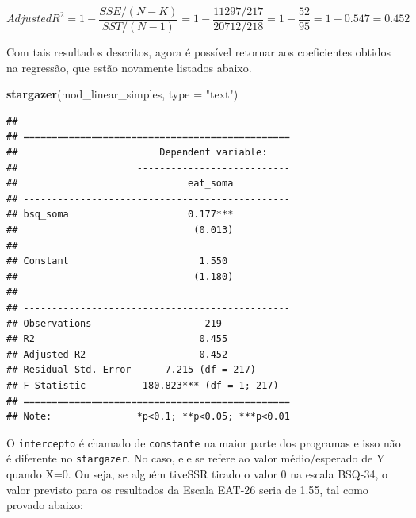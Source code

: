 \documentclass[
]{book}
\newenvironment{Shaded}{\begin{snugshade}}{\end{snugshade}}
\newcommand{\CommentTok}[1]{\textcolor[rgb]{0.56,0.35,0.01}{\textit{#1}}}
\newcommand{\DataTypeTok}[1]{\textcolor[rgb]{0.13,0.29,0.53}{#1}}
\newcommand{\DecValTok}[1]{\textcolor[rgb]{0.00,0.00,0.81}{#1}}
\newcommand{\KeywordTok}[1]{\textcolor[rgb]{0.13,0.29,0.53}{\textbf{#1}}}
\newcommand{\NormalTok}[1]{#1}
\newcommand{\OperatorTok}[1]{\textcolor[rgb]{0.81,0.36,0.00}{\textbf{#1}}}
\newcommand{\StringTok}[1]{\textcolor[rgb]{0.31,0.60,0.02}{#1}}
\begin{document}
\[Adjusted R^2 = 1 - \frac{SSE/(N-K)}{SST/(N-1)} = 1-\frac{11297/217}{20712/218} = 1-\frac{52}{95} = 1 - 0.547 = 0.452\]

\begin{Shaded}
\end{Shaded}

Com tais resultados descritos, agora é possível retornar aos coeficientes obtidos na regressão, que estão novamente listados abaixo.

\begin{Shaded}
\begin{Highlighting}[]
\KeywordTok{stargazer}\NormalTok{(mod_linear_simples, }\DataTypeTok{type =} \StringTok{"text"}\NormalTok{)}
\end{Highlighting}
\end{Shaded}

\begin{verbatim}
## 
## ===============================================
##                         Dependent variable:    
##                     ---------------------------
##                              eat_soma          
## -----------------------------------------------
## bsq_soma                     0.177***          
##                               (0.013)          
##                                                
## Constant                       1.550           
##                               (1.180)          
##                                                
## -----------------------------------------------
## Observations                    219            
## R2                             0.455           
## Adjusted R2                    0.452           
## Residual Std. Error      7.215 (df = 217)      
## F Statistic          180.823*** (df = 1; 217)  
## ===============================================
## Note:               *p<0.1; **p<0.05; ***p<0.01
\end{verbatim}

O \texttt{intercepto} é chamado de \texttt{constante} na maior parte dos programas e isso não é diferente no \texttt{stargazer}. No caso, ele se refere ao valor médio/esperado de Y quando X=0. Ou seja, se alguém tiveSSR tirado o valor 0 na escala BSQ-34, o valor previsto para os resultados da Escala EAT-26 seria de 1.55, tal como provado abaixo:
\end{document}
